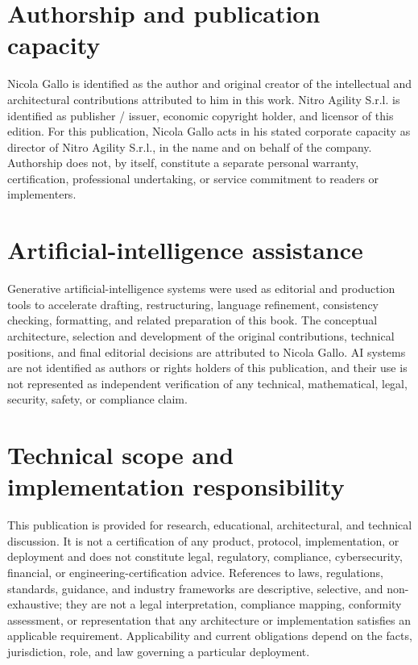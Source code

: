 \documentclass[10pt,oneside,openany]{book}
\begin{document}
\section{Authorship and publication capacity}
Nicola Gallo is identified as the author and original creator of the intellectual and architectural contributions attributed to him in this work. Nitro Agility S.r.l. is identified as publisher / issuer, economic copyright holder, and licensor of this edition. For this publication, Nicola Gallo acts in his stated corporate capacity as director of Nitro Agility S.r.l., in the name and on behalf of the company. Authorship does not, by itself, constitute a separate personal warranty, certification, professional undertaking, or service commitment to readers or implementers.

\section{Artificial-intelligence assistance}
Generative artificial-intelligence systems were used as editorial and production tools to accelerate drafting, restructuring, language refinement, consistency checking, formatting, and related preparation of this book. The conceptual architecture, selection and development of the original contributions, technical positions, and final editorial decisions are attributed to Nicola Gallo. AI systems are not identified as authors or rights holders of this publication, and their use is not represented as independent verification of any technical, mathematical, legal, security, safety, or compliance claim.

\section{Technical scope and implementation responsibility}
This publication is provided for research, educational, architectural, and technical discussion. It is not a certification of any product, protocol, implementation, or deployment and does not constitute legal, regulatory, compliance, cybersecurity, financial, or engineering-certification advice. References to laws, regulations, standards, guidance, and industry frameworks are descriptive, selective, and non-exhaustive; they are not a legal interpretation, compliance mapping, conformity assessment, or representation that any architecture or implementation satisfies an applicable requirement. Applicability and current obligations depend on the facts, jurisdiction, role, and law governing a particular deployment.
\end{document}
